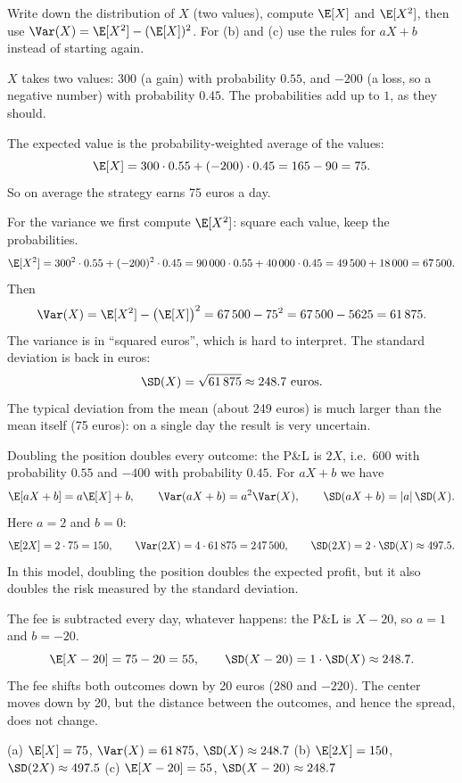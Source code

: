 \begin{solution}
	\idea Write down the distribution of $X$ (two values), compute $\E[X]$ and
	$\E[X^2]$, then use $\Var(X)=\E[X^2]-(\E[X])^2$. For (b) and (c) use the
	rules for $aX+b$ instead of starting again.

	 $X$ takes two values: $300$ (a gain) with probability $0.55$, and
	$-200$ (a loss, so a negative number) with probability $0.45$. The
	probabilities add up to $1$, as they should.

	The expected value is the probability-weighted average of the values:
	\[ \E[X]=300\cdot0.55+(-200)\cdot0.45=165-90=75. \]
	So on average the strategy earns 75 euros a day.

	For the variance we first compute $\E[X^2]$: square each value, keep the
	probabilities.
	\[ \E[X^2]=300^2\cdot0.55+(-200)^2\cdot0.45=90\,000\cdot0.55+40\,000\cdot0.45
		=49\,500+18\,000=67\,500. \]
	Then
	\[ \Var(X)=\E[X^2]-\big(\E[X]\big)^2=67\,500-75^2=67\,500-5625=61\,875. \]
	The variance is in ``squared euros'', which is hard to interpret. The
	standard deviation is back in euros:
	\[ \SD(X)=\sqrt{61\,875}\approx248.7\text{ euros}. \]
	The typical deviation from the mean (about 249 euros) is much larger than
	the mean itself (75 euros): on a single day the result is very uncertain.

	 Doubling the position doubles every outcome: the P\&L is $2X$,
	i.e.\ $600$ with probability $0.55$ and $-400$ with probability $0.45$. For
	$aX+b$ we have
	\[ \E[aX+b]=a\E[X]+b,\qquad \Var(aX+b)=a^2\Var(X),\qquad
		\SD(aX+b)=|a|\,\SD(X). \]
	Here $a=2$ and $b=0$:
	\[ \E[2X]=2\cdot75=150,\qquad \Var(2X)=4\cdot61\,875=247\,500,\qquad
		\SD(2X)=2\cdot\SD(X)\approx497.5. \]
	In this model, doubling the position doubles the expected profit, but it
	also doubles the risk measured by the standard deviation.

	 The fee is subtracted every day, whatever happens: the P\&L is
	$X-20$, so $a=1$ and $b=-20$.
	\[ \E[X-20]=75-20=55,\qquad \SD(X-20)=1\cdot\SD(X)\approx248.7. \]
	The fee shifts both outcomes down by 20 euros ($280$ and $-220$). The center
	moves down by 20, but the distance between the outcomes, and hence the
	spread, does not change.
	\begin{answer}
		(a) $\E[X]=75$, $\Var(X)=61\,875$, $\SD(X)\approx248.7$ \quad
		(b) $\E[2X]=150$, $\SD(2X)\approx497.5$ \quad
		(c) $\E[X-20]=55$, $\SD(X-20)\approx248.7$
	\end{answer}
\end{solution}

